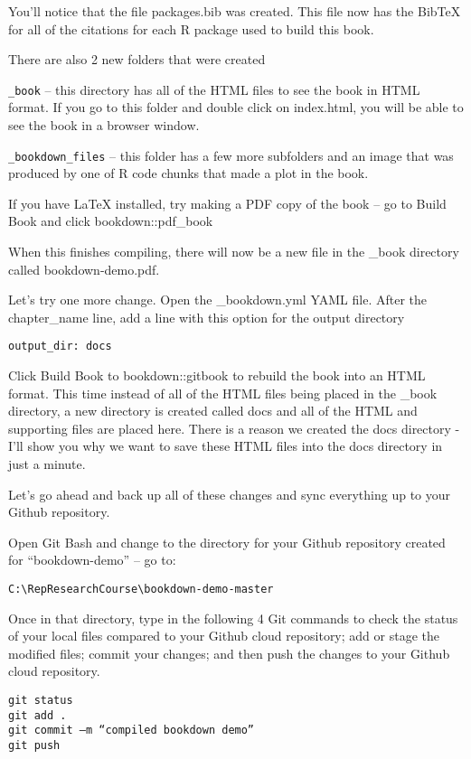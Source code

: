 \documentclass[]{book}
\theoremstyle{definition}
\theoremstyle{definition}
\theoremstyle{definition}
\theoremstyle{remark}
\begin{document}
You'll notice that the file packages.bib was created. This file now has
the BibTeX for all of the citations for each R package used to build
this book.

There are also 2 new folders that were created

\texttt{\_book} -- this directory has all of the HTML files to see the
book in HTML format. If you go to this folder and double click on
index.html, you will be able to see the book in a browser window.

\texttt{\_bookdown\_files} -- this folder has a few more subfolders and
an image that was produced by one of R code chunks that made a plot in
the book.

If you have LaTeX installed, try making a PDF copy of the book -- go to
Build Book and click bookdown::pdf\_book

When this finishes compiling, there will now be a new file in the \_book
directory called bookdown-demo.pdf.

Let's try one more change. Open the \_bookdown.yml YAML file. After the
chapter\_name line, add a line with this option for the output directory

\texttt{output\_dir:\ docs}

Click Build Book to bookdown::gitbook to rebuild the book into an HTML
format. This time instead of all of the HTML files being placed in the
\_book directory, a new directory is created called docs and all of the
HTML and supporting files are placed here. There is a reason we created
the docs directory - I'll show you why we want to save these HTML files
into the docs directory in just a minute.

Let's go ahead and back up all of these changes and sync everything up
to your Github repository.

Open Git Bash and change to the directory for your Github repository
created for ``bookdown-demo'' -- go to:

\texttt{C:\textbackslash{}RepResearchCourse\textbackslash{}bookdown-demo-master}

Once in that directory, type in the following 4 Git commands to check
the status of your local files compared to your Github cloud repository;
add or stage the modified files; commit your changes; and then push the
changes to your Github cloud repository.

\begin{verbatim}
git status
git add .
git commit –m “compiled bookdown demo”
git push
\end{verbatim}
\end{document}

